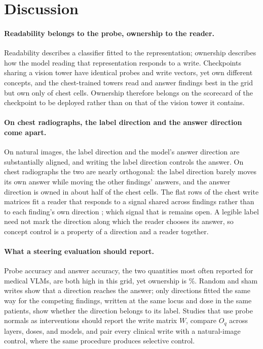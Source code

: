 \documentclass{article}
\begin{document}
\FloatBarrier
\section{Discussion}
\label{sec:implications}

\paragraph{Readability belongs to the probe, ownership to the reader.}
Readability describes a classifier fitted to the representation; ownership describes how the model reading that representation responds to a write. Checkpoints sharing a vision tower have identical probes and write vectors, yet own different concepts, and the chest-trained towers read and answer findings best in the grid but own only \cfSpecTowerOwned{} of \cfSpecTowerN{} chest cells. Ownership therefore belongs on the scorecard of the checkpoint to be deployed rather than on that of the vision tower it contains.

\paragraph{On chest radiographs, the label direction and the answer direction come apart.}
On natural images, the label direction and the model's answer direction are substantially aligned, and writing the label direction controls the answer. On chest radiographs the two are nearly orthogonal: the label direction barely moves its own answer while moving the other findings' answers, and the answer direction is owned in about half of the chest cells. The flat rows of the chest write matrices fit a reader that responds to a signal shared across findings rather than to each finding's own direction \citep{pahde2025navigating}; which signal that is remains open. A legible label need not mark the direction along which the reader chooses its answer, so concept control is a property of a direction and a reader together.

\paragraph{What a steering evaluation should report.}
Probe accuracy and answer accuracy, the two quantities most often reported for medical VLMs, are both high in this grid, yet ownership is \cfChestOwnedPct\%. Random and sham writes show that a direction reaches the answer; only directions fitted the same way for the competing findings, written at the same locus and dose in the same patients, show whether the direction belongs to its label. Studies that use probe normals as interventions should report the write matrix $W$, compare $O_q$ across layers, doses, and models, and pair every clinical write with a natural-image control, where the same procedure produces selective control.
\end{document}
